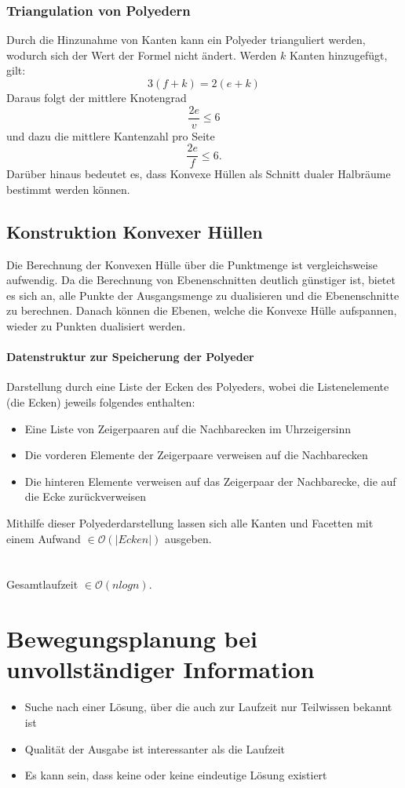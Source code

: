 \subsubsection{Triangulation von Polyedern}
Durch die Hinzunahme von Kanten kann ein Polyeder trianguliert werden, wodurch sich der Wert der Formel nicht ändert. Werden \(k\) Kanten hinzugefügt, gilt:
\[3(f+k) = 2(e+k)\]
Daraus folgt der mittlere Knotengrad
\[\frac{2e}{v} \leq 6\]
und dazu die mittlere Kantenzahl pro Seite
\[\frac{2e}{f} \leq 6.\]
Darüber hinaus bedeutet es, dass Konvexe Hüllen als Schnitt dualer Halbräume bestimmt werden können.


\subsection{Konstruktion Konvexer Hüllen}
Die Berechnung der Konvexen Hülle über die Punktmenge ist vergleichsweise aufwendig. Da die Berechnung von Ebenenschnitten deutlich günstiger ist, bietet es sich an, alle Punkte der Ausgangsmenge zu dualisieren und die Ebenenschnitte zu berechnen. Danach können die Ebenen, welche die Konvexe Hülle aufspannen, wieder zu Punkten dualisiert werden.

\paragraph{Datenstruktur zur Speicherung der Polyeder}
Darstellung durch eine Liste der Ecken des Polyeders, wobei die Listenelemente (die Ecken) jeweils folgendes enthalten:
\begin{itemize}
	\item Eine Liste von Zeigerpaaren auf die Nachbarecken im Uhrzeigersinn
	\item Die vorderen Elemente der Zeigerpaare verweisen auf die Nachbarecken
	\item Die hinteren Elemente verweisen auf das Zeigerpaar der Nachbarecke, die auf die Ecke zurückverweisen
\end{itemize}
Mithilfe dieser Polyederdarstellung lassen sich alle Kanten und Facetten mit einem Aufwand \(\in \mathcal{O}(|Ecken|)\) ausgeben.
\text{}\\\\

\text{}\\
Gesamtlaufzeit \(\in \mathcal{O}(nlogn)\).



\section{Bewegungsplanung bei unvollständiger Information}
\begin{itemize}
	\item Suche nach einer Lösung, über die auch zur Laufzeit nur Teilwissen bekannt ist
	\item Qualität der Ausgabe ist interessanter als die Laufzeit
	\item Es kann sein, dass keine oder keine eindeutige Lösung existiert
\end{itemize}


